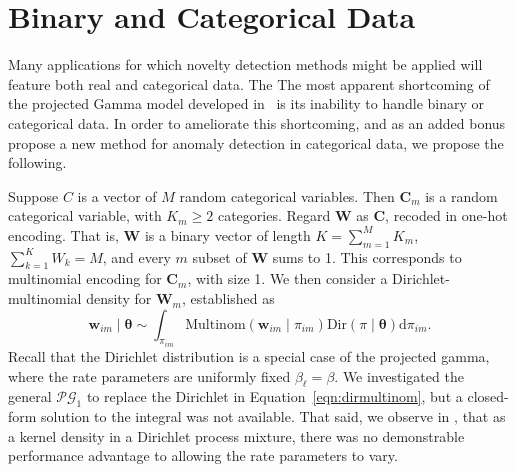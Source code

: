 \section{Binary and Categorical Data}
Many applications for which novelty detection methods might be applied will 
    feature both real and categorical data.  The  The most apparent 
    shortcoming of the projected Gamma model developed in~\cite{trubey:pg} is
    its inability to handle binary or categorical data.  In order to ameliorate this
    shortcoming, and as an added bonus propose a new method for anomaly detection in
    categorical data, we propose the following.

Suppose $C$ is a vector of $M$ random categorical variables.  Then $\bm{C}_{m}$ 
    is a random categorical variable, with $K_{m} \geq 2$ categories. Regard $\bm{W}$ 
    as $\bm{C}$, recoded in one-hot encoding.  That is, $\bm{W}$ is a binary vector of 
    length $K = \sum_{m = 1}^M K_{m}$, $\sum_{k = 1}^K W_k = M$, and every $m$ subset 
    of $\bm{W}$ sums to 1.  This corresponds to multinomial encoding for $\bm{C}_m$,
    with size 1. We then consider a Dirichlet-multinomial density for $\bm{W}_m$,
    established as
  \begin{equation}
    \label{eqn:dirmultinom}
    \bm{w}_{im}\mid\bm{\theta} 
    \sim 
    \int_{\pi_{im}} 
    \text{Multinom}(\bm{w}_{im}\mid\pi_{im})
    \text{Dir}(\pi\mid\bm{\theta})\text{d}\pi_{im}.
  \end{equation}
  Recall that the Dirichlet distribution is a special case of the projected gamma,
  where the rate parameters are uniformly fixed $\beta_{\ell} = \beta$.  We 
  investigated the general $\mathcal{PG}_1$ to replace the Dirichlet in 
  Equation~\ref{eqn:dirmultinom}, but a closed-form solution to the integral was 
  not available.  That said, we observe in \cite{trubey:pg}, that as a kernel 
  density in a Dirichlet process mixture, there was no demonstrable performance 
  advantage to allowing the rate parameters to vary.
 
